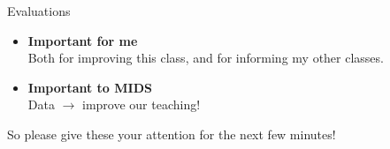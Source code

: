 \documentclass[11pt]{beamer}
\begin{document}
\begin{frame}[c]{Evaluations}
\begin{itemize}
  \pause \item \textbf{Important for me} \\
  \pause Both for improving this class, and for informing my other classes.
  \pause \item \textbf{Important to MIDS} \\
  Data $\rightarrow$ improve our teaching!
\end{itemize}
\pause So please give these your attention for the next few minutes!
\end{frame}
\end{document}
